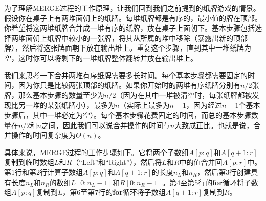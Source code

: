 \documentclass[lang=cn,newtx,10pt,scheme=chinese]{elegantbook}
\begin{document}
为了理解MERGE过程的工作原理，让我们回到我们之前提到的纸牌游戏的情景。假设你在桌子上有两堆面朝上的纸牌。每堆纸牌都是有序的，最小值的牌在顶部。你希望将这两堆纸牌合并成一堆有序的纸牌，放在桌子上面朝下。基本步骤包括选择两堆面朝上纸牌中较小的一张牌，将其从所属的堆中移除（暴露出新的顶部牌），然后将这张牌面朝下放在输出堆上。重复这个步骤，直到其中一堆纸牌为空，这时你可以将剩下的一堆纸牌整体翻转并放在输出堆上。

我们来思考一下合并两堆有序纸牌需要多长时间。每个基本步骤都需要固定的时间，因为你只是比较两张顶部的纸牌。如果你开始时的两堆有序纸牌分别有$n/2$张牌，那么基本步骤的数量至少为$n/2$（因为在其中一堆被清空时，每张纸牌都被发现比另一堆的某张纸牌小），最多为$n$（实际上最多为$n-1$，因为经过$n-1$个基本步骤后，其中一堆必定为空）。每个基本步骤花费固定的时间，而总的基本步骤数量在$n/2$和$n$之间，因此我们可以说合并操作的时间与$n$大致成正比。也就是说，合并操作的时间复杂度为$\Theta(n)$。

具体来说，MERGE过程的工作步骤如下。它将两个子数组$A[p:q]$和$A[q+1:r]$复制到临时数组$L$和$R$（``Left''和``Right''），然后将$L$和$R$中的值合并回$A[p:r]$中。第1行和第2行计算子数组$A[p:q]$和$A[q+1:r]$的长度$n_L$和$n_R$，然后第3行创建具有长度$n_L$和$n_R$的数组$L[0:n_L-1]$和$R[0:n_R-1]$。第4至第5行的\textbf{for}循环将子数组$A[p:q]$复制到$L$，第6至第7行的\textbf{for}循环将子数组$A[q+1:r]$复制到$R$。
\end{document}
